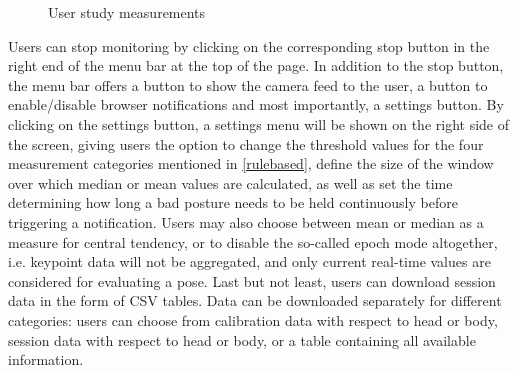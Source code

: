 \begin{figure}[htpb]
\centering
  \caption{User study measurements}
  \label{fig:measurements}
\end{figure}

Users can stop monitoring by clicking on the corresponding stop button in the right end of the menu bar at the top of the page. In addition to the stop button, the menu bar offers a button to show the camera feed to the user, a button to enable/disable browser notifications and most importantly, a settings button. By clicking on the settings button, a settings menu will be shown on the right side of the screen, giving users the option to change the threshold values for the four measurement categories mentioned in \autoref{rulebased}, define the size of the window over which median or mean values are calculated, as well as set the time determining how long a bad posture needs to be held continuously before triggering a notification. Users may also choose between mean or median as a measure for central tendency, or to disable the so-called epoch mode altogether, i.e. keypoint data will not be aggregated, and only current real-time values are considered for evaluating a pose. Last but not least, users can download session data in the form of CSV tables. Data can be downloaded separately for different categories: users can choose from calibration data with respect to head or body, session data with respect to head or body, or a table containing all available information.

